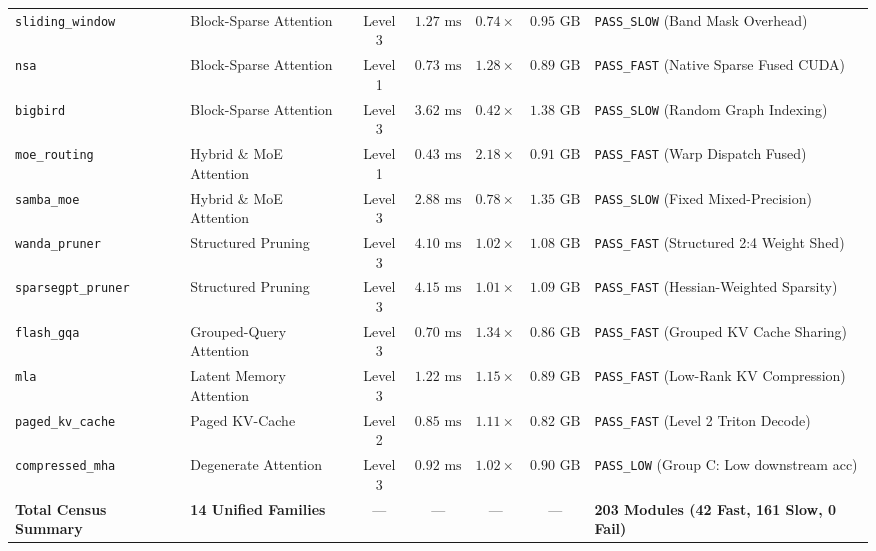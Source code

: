 \begin{table}[t]
\begin{tabular}{l l c c c c l}
\midrule
\texttt{sliding\_window}            & Block-Sparse Attention & Level 3 & $1.27\text{ ms}$ & $0.74\times$ & $0.95\text{ GB}$ & \texttt{PASS\_SLOW} (Band Mask Overhead) \\
\texttt{nsa}                        & Block-Sparse Attention & Level 1 & $0.73\text{ ms}$ & $1.28\times$ & $0.89\text{ GB}$ & \texttt{PASS\_FAST} (Native Sparse Fused CUDA) \\
\texttt{bigbird}                    & Block-Sparse Attention & Level 3 & $3.62\text{ ms}$ & $0.42\times$ & $1.38\text{ GB}$ & \texttt{PASS\_SLOW} (Random Graph Indexing) \\
\midrule
\texttt{moe\_routing}               & Hybrid \& MoE Attention & Level 1 & $0.43\text{ ms}$ & $2.18\times$ & $0.91\text{ GB}$ & \texttt{PASS\_FAST} (Warp Dispatch Fused) \\
\texttt{samba\_moe}                 & Hybrid \& MoE Attention & Level 3 & $2.88\text{ ms}$ & $0.78\times$ & $1.35\text{ GB}$ & \texttt{PASS\_SLOW} (Fixed Mixed-Precision) \\
\midrule
\texttt{wanda\_pruner}              & Structured Pruning & Level 3 & $4.10\text{ ms}$ & $1.02\times$ & $1.08\text{ GB}$ & \texttt{PASS\_FAST} (Structured 2:4 Weight Shed) \\
\texttt{sparsegpt\_pruner}          & Structured Pruning & Level 3 & $4.15\text{ ms}$ & $1.01\times$ & $1.09\text{ GB}$ & \texttt{PASS\_FAST} (Hessian-Weighted Sparsity) \\
\midrule
\texttt{flash\_gqa}                 & Grouped-Query Attention & Level 3 & $0.70\text{ ms}$ & $1.34\times$ & $0.86\text{ GB}$ & \texttt{PASS\_FAST} (Grouped KV Cache Sharing) \\
\texttt{mla}                        & Latent Memory Attention & Level 3 & $1.22\text{ ms}$ & $1.15\times$ & $0.89\text{ GB}$ & \texttt{PASS\_FAST} (Low-Rank KV Compression) \\
\texttt{paged\_kv\_cache}           & Paged KV-Cache & Level 2 & $0.85\text{ ms}$ & $1.11\times$ & $0.82\text{ GB}$ & \texttt{PASS\_FAST} (Level 2 Triton Decode) \\
\midrule
\texttt{compressed\_mha}            & Degenerate Attention & Level 3 & $0.92\text{ ms}$ & $1.02\times$ & $0.90\text{ GB}$ & \texttt{PASS\_LOW} (Group C: Low downstream acc) \\
\midrule
\textbf{Total Census Summary}       & \textbf{14 Unified Families} & — & — & — & — & \textbf{203 Modules (42 Fast, 161 Slow, 0 Fail)} \\
\bottomrule
\end{tabular}
\end{table}

